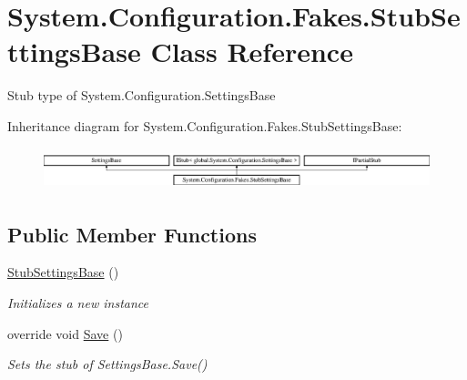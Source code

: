 \hypertarget{class_system_1_1_configuration_1_1_fakes_1_1_stub_settings_base}{\section{System.\-Configuration.\-Fakes.\-Stub\-Settings\-Base Class Reference}
\label{class_system_1_1_configuration_1_1_fakes_1_1_stub_settings_base}
}


Stub type of System.\-Configuration.\-Settings\-Base 


Inheritance diagram for System.\-Configuration.\-Fakes.\-Stub\-Settings\-Base\-:\begin{figure}[H]
\begin{center}
\leavevmode
\includegraphics[height=1.220044cm]{class_system_1_1_configuration_1_1_fakes_1_1_stub_settings_base}
\end{center}
\end{figure}
\subsection*{Public Member Functions}
\begin{DoxyCompactItemize}
\item 
\hyperlink{class_system_1_1_configuration_1_1_fakes_1_1_stub_settings_base_a21ffc184a850e44547e9e481bc15a665}{Stub\-Settings\-Base} ()
\begin{DoxyCompactList}\small\item\em Initializes a new instance\end{DoxyCompactList}\item 
override void \hyperlink{class_system_1_1_configuration_1_1_fakes_1_1_stub_settings_base_a682b04e1679994bbdd5beb25cef02f08}{Save} ()
\begin{DoxyCompactList}\small\item\em Sets the stub of Settings\-Base.\-Save()\end{DoxyCompactList}\end{DoxyCompactItemize}
